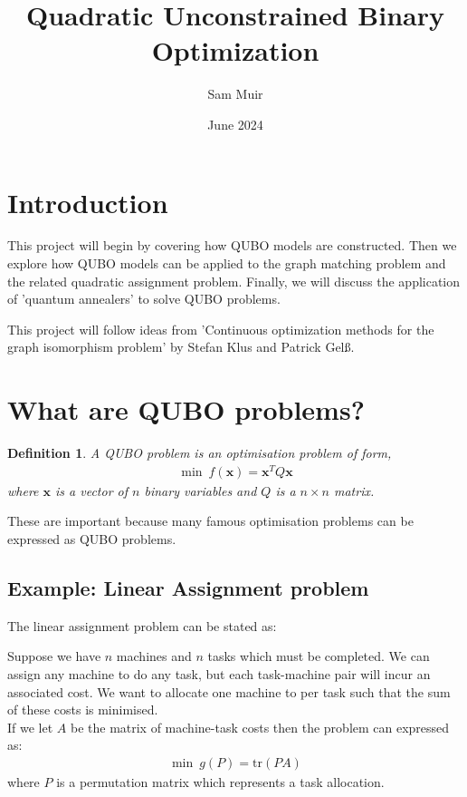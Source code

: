 \documentclass{article}
\title{Quadratic Unconstrained Binary Optimization}
\author{Sam Muir }
\date{June 2024}
\newtheorem{defn}[prop]{Definition}
\begin{document}
\maketitle

\section{Introduction}

This project will begin by covering how QUBO models are constructed. Then we explore how QUBO models can be applied to the graph matching problem and the related quadratic assignment problem. Finally, we will discuss the application of 'quantum annealers' to solve QUBO problems. 

This project will follow ideas from 'Continuous optimization methods for the graph isomorphism problem' by Stefan Klus and Patrick Gelß.

\section{What are QUBO problems?}
\begin{defn}
A QUBO problem is an optimisation problem of form, 
\begin{align*}
    \min \: f(\mathbf{x}) = \mathbf{x}^T Q \mathbf{x}
\end{align*}
where \(\mathbf{x}\) is a vector of \(n\) binary variables and \(Q\) is a \(n \times n\) matrix.
\end{defn}

\noindent These are important because many famous optimisation problems can be expressed as QUBO problems. 

\subsection{Example: Linear Assignment problem}

The linear assignment problem can be stated as:

Suppose we have \(n\) machines and \(n\) tasks which must be completed. We can assign any machine to do any task, but each task-machine pair will incur an associated cost. We want to allocate one machine to per task such that the sum of these costs is minimised. \\

\noindent If we let \(A\) be the matrix of machine-task costs then the problem can expressed as: 
\begin{align*}
    \min \: g(P) = \text{tr}(PA)
\end{align*}
where \(P\) is a permutation matrix which represents a task allocation. \\
\end{document}
